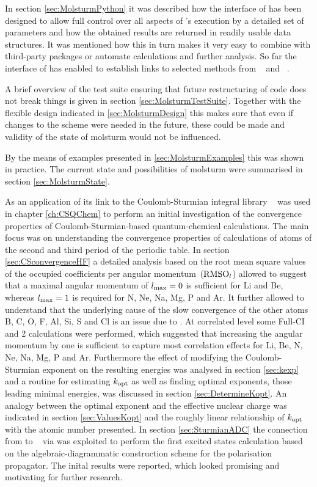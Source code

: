 In section \ref{sec:MolsturmPython} it was described
how the \python interface of \molsturm
has been designed to allow full control over all aspects
of \molsturm's execution by a detailed set of parameters
and how the obtained results are returned
in readily usable data structures.
It was mentioned how this in turn
makes it very easy to combine \molsturm
with third-party packages
or automate calculations and further analysis.
So far the \python interface of \molsturm
has enabled to establish
links to selected methods
from \pyscf~\cite{Sun2017} and \adcman~\cite{Wormit2014}.

A brief overview of the test suite
ensuring that future restructuring of code does not break things is
given in section \ref{sec:MolsturmTestSuite}.
Together with the flexible design
indicated in \ref{sec:MolsturmDesign}
this makes sure that even if changes to the \SCF scheme
were needed in the future,
these could be made and validity of the state of molsturm would not
be influenced.

By the means of examples presented in \ref{sec:MolsturmExamples}
this was shown in practice.
The current state and possibilities of molsturm
were summarised in section \ref{sec:MolsturmState}.



As an application of \molsturm its link to the
Coulomb-Sturmian integral library \sturmint~\cite{sturmintWeb} was used
in chapter \ref{ch:CSQChem} to perform an initial investigation
of the convergence properties of Coulomb-Sturmian-based
quantum-chemical calculations.
The main focus was on understanding the convergence
properties of \HF calculations of atoms
of the second and third period of the periodic table.
In section \ref{sec:CSconvergenceHF}
a detailed analysis based on the root mean square values
of the occupied coefficients per angular momentum~($\text{RMSO}_l$)
allowed to suggest that
a maximal angular momentum of $l_\text{max} = 0$
is sufficient for Li and Be,
whereas $l_\text{max} = 1$ is required for N, Ne, Na, Mg, P and Ar.
It further allowed to understand that the
underlying cause of the slow convergence of the other
atoms B, C, O, F, Al, Si, S and Cl is an issue due to \UHF.
At correlated level some Full-CI and {\MP}2 calculations
were performed,
which suggested that increasing the angular momentum
by one is sufficient to capture
most correlation effects for Li, Be, N, Ne, Na, Mg, P and Ar.
Furthermore the effect of modifying the Coulomb-Sturmian
exponent on the resulting \HF energies was analysed in section \ref{sec:kexp}
and a routine for estimating $k_\text{opt}$ as well as finding
optimal exponents, \ie those leading minimal energies,
was discussed in section \ref{sec:DetermineKopt}.
An analogy between the optimal exponent and
the effective nuclear charge was indicated in section \ref{sec:ValuesKopt}
and the roughly
linear relationship of $k_\text{opt}$ with the atomic number presented.
In section \ref{sec:SturmianADC} the connection from
\molsturm to \adcman~\cite{Wormit2014} via \python
was exploited to perform the first
excited states calculation based on the algebraic-diagrammatic construction
scheme for the polarisation propagator.
The inital results were reported,
which looked promising and motivating for further research.

